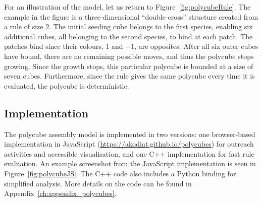 For an illustration of the model, let us return to Figure~\ref{fig:polycubeRule}. The example in the figure is a three-dimensional ``double-cross'' structure created from a rule of size 2. The initial seeding cube belongs to the first species, enabling six additional cubes, all belonging to the second species, to bind at each patch. The patches bind since their colours, \(1\) and \(-1\), are opposites. After all six outer cubes have bound, there are no remaining possible moves, and thus the polycube stops growing. Since the growth stops, this particular polycube is bounded at a size of seven cubes. Furthermore, since the rule gives the same polycube every time it is evaluated, the polycube is deterministic.



\subsection{Implementation}

The polycube assembly model is implemented in two versions: one browser-based implementation in JavaScript (\url{https://akodiat.github.io/polycubes}) for outreach activities and accessible visualisation, and one C++ implementation for fast rule evaluation. An example screenshot from the JavaScript implementation is seen in Figure~\ref{fig:polycubeJS}. The C++ code also includes a Python binding for simplified analysis. More details on the code can be found in Appendix~\ref{ch:appendix_polycubes}.

